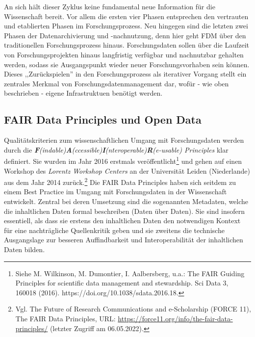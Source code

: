 An sich hält dieser Zyklus keine fundamental neue Information für die Wissenschaft bereit. Vor allem die ersten vier Phasen entsprechen den vertrauten und etablierten Phasen im Forschungsprozess. Neu hingegen sind die letzten zwei Phasen der Datenarchivierung und -nachnutzung, denn hier geht FDM über den traditionellen Forschungsprozess hinaus. Forschungsdaten sollen über die Laufzeit von Forschungsprojekten hinaus langfristig verfügbar und nachnutzbar gehalten werden, sodass sie Ausgangspunkt wieder neuer Forschungsvorhaben sein können. Dieses ,,Zurückspielen'' in den Forschungsprozess als iterativer Vorgang stellt ein zentrales Merkmal von Forschungsdatenmanagement dar, wofür - wie oben beschrieben - eigene Infrastruktuen benötigt werden.

\subsection{FAIR Data Principles und Open Data}

Qualitätskriterien zum wissenschaftlichen Umgang mit Forschungsdaten werden durch die \textit{\textbf{F}(indable)\textbf{A}(ccessible)\textbf{I}(nteroperable)\textbf{R}(e-usable) Principles} klar definiert. Sie wurden im Jahr 2016 erstmals veröffentlicht\footnote{Siehe M. Wilkinson, M. Dumontier, I. Aalbersberg, u.a.: The FAIR Guiding Principles for scientific data management and stewardship. Sci Data 3, 160018 (2016). https://doi.org/10.1038/sdata.2016.18.} und gehen auf einen Workshop des \textit{Lorentz Workshop Centers} an der Universität Leiden (Niederlande) aus dem Jahr 2014 zurück.\footnote{Vgl. The Future of Research Communications and e-Scholarship (FORCE 11), The FAIR Data Principles, URL: \url{https://force11.org/info/the-fair-data-principles/} (letzter Zugriff am 06.05.2022).} Die FAIR Data Principles haben sich seitdem zu einem Best Practice im Umgang mit Forschungsdaten in der Wissenschaft entwickelt. Zentral bei deren Umsetzung sind die sogenannten Metadaten, welche die inhaltlichen Daten formal beschreiben (Daten über Daten). Sie sind insofern essentiell, als dass sie erstens den inhaltlichen Daten den notwendigen Kontext für eine nachträgliche Quellenkritik geben und sie zweitens die technische Ausgangslage zur besseren Auffindbarkeit und Interoperabilität der inhaltlichen Daten bilden. 

